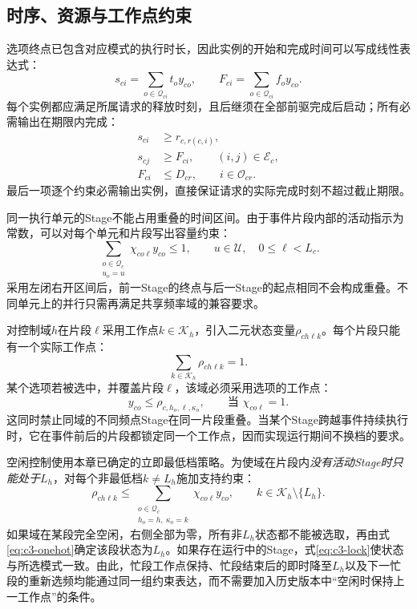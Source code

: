 \subsection{时序、资源与工作点约束}

选项终点已包含对应模式的执行时长，因此实例的开始和完成时间可以写成线性表达式：
\begin{equation}
 s_{ci}=\sum_{o\in\mathcal Q_{ci}}t_o y_{co},\qquad
 F_{ci}=\sum_{o\in\mathcal Q_{ci}}f_o y_{co}.
 \label{eq:c3-option-time}
\end{equation}
每个实例都应满足所属请求的释放时刻，且后继须在全部前驱完成后启动；所有必需输出在期限内完成：
\begin{equation}
 \begin{aligned}
 s_{ci}&\ge r_{c,r(c,i)},\\
 s_{cj}&\ge F_{ci},\qquad(i,j)\in\mathcal E_c,\\
 F_{ci}&\le D_{cr},\qquad i\in\mathcal O_{cr}.
 \end{aligned}
 \label{eq:c3-schedule-constraints}
\end{equation}
最后一项逐个约束必需输出实例，直接保证请求的实际完成时刻不超过截止期限。

同一执行单元的Stage不能占用重叠的时间区间。由于事件片段内部的活动指示为常数，可以对每个单元和片段写出容量约束：
\begin{equation}
 \sum_{\substack{o\in\mathcal Q_c\\u_o=u}}
       \chi_{co\ell}y_{co}\le1,
 \qquad u\in\mathcal U,\quad 0\le\ell<L_c.
 \label{eq:c3-occupancy}
\end{equation}
采用左闭右开区间后，前一Stage的终点与后一Stage的起点相同不会构成重叠。不同单元上的并行只需再满足共享频率域的兼容要求。

对控制域$h$在片段$\ell$采用工作点$k\in\mathcal K_h$，引入二元状态变量$\rho_{ch\ell k}$。每个片段只能有一个实际工作点：
\begin{equation}
 \sum_{k\in\mathcal K_h}\rho_{ch\ell k}=1.
 \label{eq:c3-onehot}
\end{equation}
某个选项若被选中，并覆盖片段$\ell$，该域必须采用选项的工作点：
\begin{equation}
 y_{co}\le \rho_{c,h_o,\ell,\kappa_o},
 \qquad\text{当 }\chi_{co\ell}=1.
 \label{eq:c3-lock}
\end{equation}
这同时禁止同域的不同频点Stage在同一片段重叠。当某个Stage跨越事件持续执行时，它在事件前后的片段都锁定同一个工作点，因而实现运行期间不换档的要求。

空闲控制使用本章已确定的立即最低档策略。为使域在片段内\emph{没有活动Stage时只能处于$L_h$}，对每个非最低档$k\ne L_h$施加支持约束：
\begin{equation}
 \rho_{ch\ell k}\le
 \sum_{\substack{o\in\mathcal Q_c\\h_o=h,\ \kappa_o=k}}
      \chi_{co\ell}y_{co},
 \qquad k\in\mathcal K_h\setminus\{L_h\}.
 \label{eq:c3-auto-low}
\end{equation}
如果域在某段完全空闲，右侧全部为零，所有非$L_h$状态都不能被选取，再由式\eqref{eq:c3-onehot}确定该段状态为$L_h$。如果存在运行中的Stage，式\eqref{eq:c3-lock}使状态与所选模式一致。由此，忙段工作点保持、忙段结束后的即时降至$L_h$以及下一忙段的重新选频均能通过同一组约束表达，而不需要加入历史版本中“空闲时保持上一工作点”的条件。

